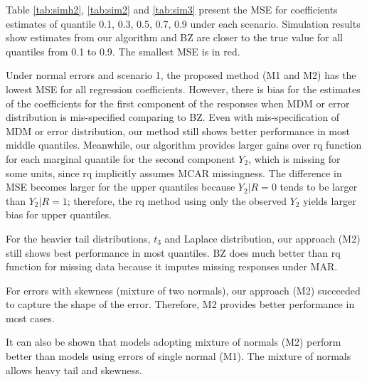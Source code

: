 \documentclass[useAMS,usenatbib,referee]{biom}
\begin{document}

Table \ref{tab:simh2}, \ref{tab:sim2} and \ref{tab:sim3} present the MSE for coefficients estimates of quantile 0.1, 0.3, 0.5, 0.7, 0.9 under each scenario.
Simulation results show estimates from our algorithm and BZ are closer to the true value for all quantiles from 0.1 to 0.9.
The smallest MSE is in red.

Under normal errors and scenario 1, the proposed method (M1 and M2) has the lowest MSE for all regression coefficients.
However, there is bias for the estimates of the coefficients for the first component of the responses when MDM or error distribution is mis-specified comparing to BZ.
Even with mis-specification of MDM or error distribution, our method still shows better performance in most middle quantiles.
Meanwhile, our algorithm provides larger gains over rq function for each
marginal quantile for the second component $Y_2$, which is missing for some units,
since rq implicitly assumes MCAR missingness.
The difference in MSE becomes larger for the upper quantiles because $Y_2 |R = 0$ tends to be larger than $Y_2 | R = 1$;
therefore, the rq method using only the observed $Y_2$ yields larger bias for upper quantiles.

For the heavier tail distributions, $t_3$ and Laplace distribution,
our approach (M2) still shows best performance in most quantiles.
BZ does much better than rq function for missing data because it imputes missing responses under MAR.

For errors with skewness (mixture of two normals), our approach (M2) succeeded to capture the shape of the error.
Therefore, M2 provides better performance in most cases.

It can also be shown that models adopting mixture of normals (M2) perform better than models using errors of single normal (M1).
The mixture of normals allows heavy tail and skewness.

\end{document}

